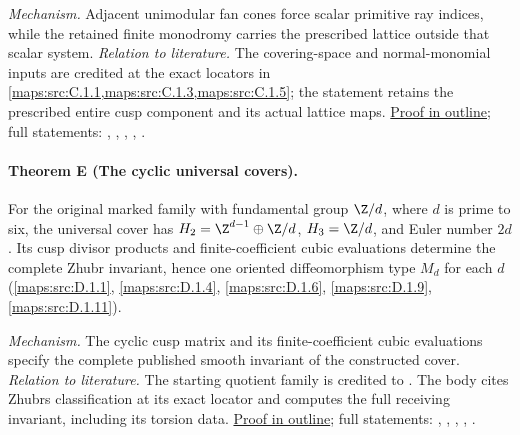 \textit{Mechanism.} Adjacent unimodular fan cones force scalar primitive ray indices, while the retained finite monodromy carries the prescribed lattice outside that scalar system.
\textit{Relation to literature.} The covering-space and normal-monomial inputs are credited at the exact locators in \cref{maps:src:C.1.1,maps:src:C.1.3,maps:src:C.1.5}; the statement retains the prescribed entire cusp component and its actual lattice maps.
\hyperlink{outline-III-D}{Proof in outline}; full statements: , , , , .

\hypertarget{main-III-E}{}
\paragraph{Theorem E (The cyclic universal covers).}
\label{series:III:E}
For the original marked family with fundamental group
$\Z/d$, where $d$ is prime to six, the universal cover has
$H_2=\Z^{d-1}\oplus\Z/d$, $H_3=\Z/d$, and Euler number
$2d$.  Its cusp divisor products and finite-coefficient cubic
evaluations determine the complete Zhubr invariant, hence one
oriented diffeomorphism type $M_d$ for each $d$
(\cref{maps:src:D.1.1}, \cref{maps:src:D.1.4}, \cref{maps:src:D.1.6}, \cref{maps:src:D.1.9}, \cref{maps:src:D.1.11}).

\textit{Mechanism.} The cyclic cusp matrix and its finite-coefficient cubic evaluations specify the complete published smooth invariant of the constructed cover.
\textit{Relation to literature.} The starting quotient family is credited to \cite[Theorems~7.17 and 7.22, pp.~57 and 60]{AC26}. The body cites Zhubr\textquotesingle s classification at its exact locator and computes the full receiving invariant, including its torsion data.
\hyperlink{outline-III-E}{Proof in outline}; full statements: , , , , .

\clearpage
\hypertarget{main-III-F}{}
